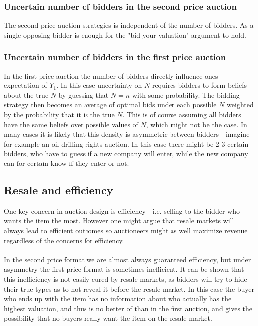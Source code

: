 \subsubsection{Uncertain number of bidders in the second price auction}
The second price auction strategies is independent of the number of bidders. As a single opposing bidder is enough for the "bid your valuation" argument to hold.

\subsubsection{Uncertain number of bidders in the first price auction}
In the first price auction the number of bidders directly influence ones expectation of $Y_1$. In this case uncertainty on $N$ requires bidders to form beliefs about the true $N$ by guessing that $N=n$ with some probability. The bidding strategy then becomes an average of optimal bids under each possible $N$ weighted by the probability that it is the true $N$. This is of course assuming all bidders have the same beliefs over possible values of $N$, which might not be the case. In many cases it is likely that this density is asymmetric between bidders - imagine for example an oil drilling rights auction. In this case there might be 2-3 certain bidders, who have to guess if a new company will enter, while the new company can for certain know if they enter or not.

\subsection{Resale and efficiency}
One key concern in auction design is efficiency - i.e. selling to the bidder who wants the item the most. However one might argue that resale markets will always lead to efficient outcomes so auctioneers might as well maximize revenue regardless of the concerns for efficiency.
\\ \\
In the second price format we are almost always guaranteed efficiency, but under asymmetry the first price format is sometimes inefficient. It can be shown that this inefficiency is not easily cured by resale markets, as bidders will try to hide their true types as to not reveal it before the resale market. In this case the buyer who ends up with the item has no information about who actually has the highest valuation, and thus is no better of than in the first auction, and gives the possibility that no buyers really want the item on the resale market.
